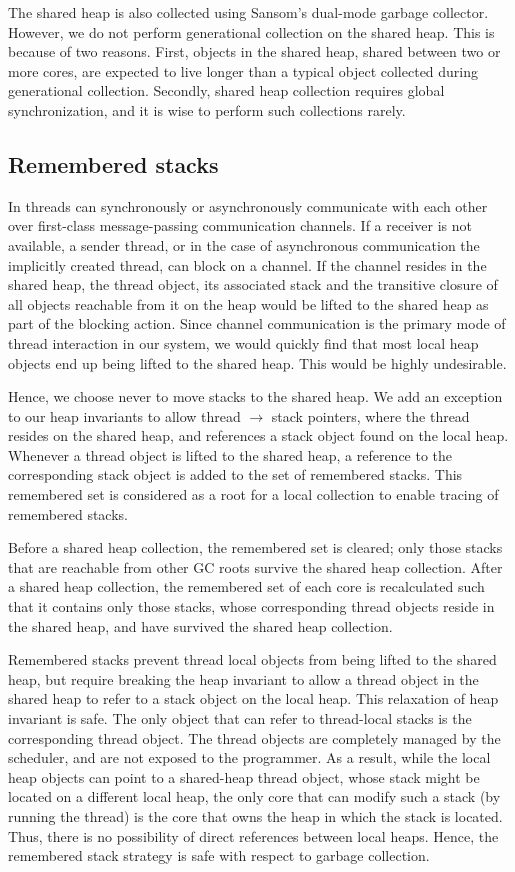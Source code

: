 The shared heap is also collected using Sansom's dual-mode garbage collector.
However, we do not perform generational collection on the shared heap. This is
because of two reasons. First, objects in the shared heap, shared between two
or more cores, are expected to live longer than a typical object collected
during generational collection. Secondly, shared heap collection requires
global synchronization, and it is wise to perform such collections rarely.

\subsection{Remembered stacks}

In \MM threads can synchronously or asynchronously communicate with each other
over first-class message-passing communication channels. If a receiver is not
available, a sender thread, or in the case of asynchronous communication the
implicitly created thread, can block on a channel. If the channel resides in
the shared heap, the thread object, its associated stack and the transitive
closure of all objects reachable from it on the heap would be lifted to the
shared heap as part of the blocking action. Since channel communication is the
primary mode of thread interaction in our system, we would quickly find that
most local heap objects end up being lifted to the shared heap. This would be
highly undesirable.

Hence, we choose never to move stacks to the shared heap. We add an exception
to our heap invariants to allow thread $\rightarrow$ stack pointers, where the
thread resides on the shared heap, and references a stack object found on the
local heap. Whenever a thread object is lifted to the shared heap, a reference
to the corresponding stack object is added to the set of remembered stacks.
This remembered set is considered as a root for a local collection to enable
tracing of remembered stacks.

Before a shared heap collection, the remembered set is cleared; only those
stacks that are reachable from other GC roots survive the shared heap
collection. After a shared heap collection, the remembered set of each core is
recalculated such that it contains only those stacks, whose corresponding
thread objects reside in the shared heap, and have survived the shared heap
collection.

Remembered stacks prevent thread local objects from being lifted to the shared
heap, but require breaking the heap invariant to allow a thread object in the
shared heap to refer to a stack object on the local heap. This relaxation of
heap invariant is safe. The only object that can refer to thread-local stacks
is the corresponding thread object. The thread objects are completely managed
by the scheduler, and are not exposed to the programmer. As a result, while the
local heap objects can point to a shared-heap thread object, whose stack might
be located on a different local heap, the only core that can modify such a
stack (by running the thread) is the core that owns the heap in which the stack
is located. Thus, there is no possibility of direct references between local
heaps. Hence, the remembered stack strategy is safe with respect to garbage
collection.

